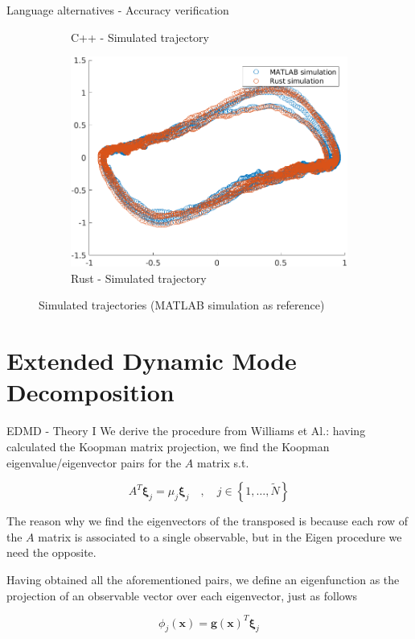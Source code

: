 \documentclass{beamer}
\begin{document}
\begin{frame}{Language alternatives - Accuracy verification}
\begin{figure}
\begin{subfigure}[b]{0.3\textwidth}
            \caption{C++ - Simulated trajectory}
            \label{fig:sim_cpp}
        \end{subfigure}
        \hfill
        \begin{subfigure}[b]{0.3\textwidth}
            \centering
            \includegraphics[width=\textwidth]{Rust_Sim.png}
            \caption{Rust - Simulated trajectory}
            \label{fig:sim_rust}
        \end{subfigure}
        \caption{Simulated trajectories (MATLAB simulation as reference)}
        \label{fig:implementations}
    \end{figure}
\end{frame}


\section{Extended Dynamic Mode Decomposition}

\begin{frame}{EDMD - Theory I}
    We derive the procedure from Williams et Al.: having calculated the Koopman matrix projection, we find the Koopman eigenvalue/eigenvector pairs for the $A$ matrix s.t.

    \begin{equation*}
        A^T \mathbf{\xi}_j = \mu_j \mathbf{\xi}_j \quad , \quad j \in \left\{1,\dots,\tilde{N}\right\}
    \end{equation*}

    The reason why we find the eigenvectors of the transposed is because each row of the $A$ matrix is associated to a single observable, but in the Eigen procedure we need the opposite.
    
    Having obtained all the aforementioned pairs, we define an eigenfunction as the projection of an observable vector over each eigenvector, just as follows

    \begin{equation*}
        \phi_j\left(\mathbf{x}\right) = \mathbf{g}\left(\mathbf{x}\right)^T \mathbf{\xi}_j
    \end{equation*}
\end{frame}
\end{document}
